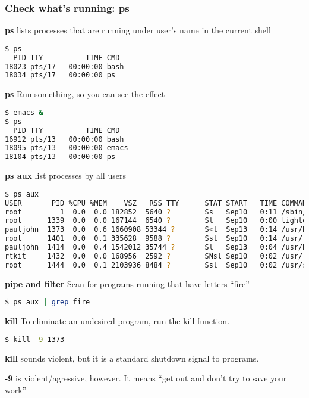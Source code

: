 \documentclass[English]{beamer}
\begin{document}
\begin{frame}
  \frametitle{Check what's running: \textbf{ps} }
 
\textbf{ps} lists processes that are running under user's name in the
     current shell
     \begin{lstlisting}[breaklines=true,language=bash]
$ ps
  PID TTY          TIME CMD
18023 pts/17   00:00:00 bash
18034 pts/17   00:00:00 ps
     \end{lstlisting}
  
\textbf{ps} Run something, so you can see the effect
     \begin{lstlisting}[breaklines=true,language=bash]
$ emacs &
$ ps
  PID TTY          TIME CMD
16912 pts/13   00:00:00 bash
18095 pts/13   00:00:00 emacs
18104 pts/13   00:00:00 ps
     \end{lstlisting}

\textbf{ps aux} list processes by all users
     \begin{lstlisting}[basicstyle={\tiny},breaklines=true,language=bash]
$ ps aux
USER       PID %CPU %MEM    VSZ   RSS TTY      STAT START   TIME COMMAND
root         1  0.0  0.0 182852  5640 ?        Ss   Sep10   0:11 /sbin/init splash
root      1339  0.0  0.0 167144  6540 ?        Sl   Sep10   0:00 lightdm --session-child 12 19
pauljohn  1373  0.0  0.6 1660908 53344 ?       S<l  Sep13   0:14 /usr/NX/bin/nxnode.bin
root      1401  0.0  0.1 335628  9588 ?        Ssl  Sep10   0:14 /usr/lib/upower/upowerd
pauljohn  1414  0.0  0.4 1542012 35744 ?       Sl   Sep13   0:04 /usr/NX/bin/nxclient.bin --monitor --pid 24
rtkit     1432  0.0  0.0 168956  2592 ?        SNsl Sep10   0:02 /usr/lib/rtkit/rtkit-daemon
root      1444  0.0  0.1 2103936 8484 ?        Ssl  Sep10   0:02 /usr/sbin/console-kit-daemon --no-daemon
     \end{lstlisting}
  
\textbf{pipe and filter}  Scan for programs running that have letters ``fire''
  \begin{lstlisting}[breaklines=true,language=bash]
$ ps aux | grep fire
\end{lstlisting}


\textbf{kill} To eliminate an undesired program, run the kill function.
  \begin{lstlisting}[breaklines=true,language=bash]
$ kill -9 1373
\end{lstlisting}

\textbf{kill} sounds violent, but it is a standard shutdown signal to programs.

\textbf{-9} is violent/agressive, however. It means ``get out and
don't try to save your work''

\end{frame}
\end{document}
